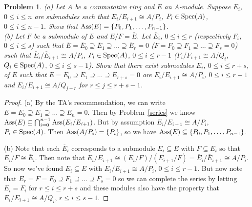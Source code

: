 \documentclass{article}
\newcommand{\ass}{\textup{Ass}}
\newcommand{\spec}{\textup{Spec}}
\newtheorem{problem}{Problem}
\begin{document}
\begin{problem}
\label{existsseries}
(a) Let $A$ be a commutative ring and $E$ an $A$-module. Suppose $E_i$, $0 \leq i \leq n$ are submodules such that $E_i/E_{i+1} \cong A/P_i$, $P_i \in \spec(A)$, $0 \leq i \leq n-1$. Show that $\ass(E) = \{P_0, P_1, \dots , P_{n-1}\}$.\\
(b) Let $F$ be a submodule of $E$ and $E/F = \overline{E}$. Let $\overline{E}_i$, $0 \leq i \leq r$ (respectively $F_i$, $0 \leq i \leq s$) such that $\overline{E} = \overline{E}_0 \supseteq \overline{E}_1 \supseteq \dots \supseteq \overline{E}_r = 0$ ($F = F_0 \supseteq F_1 \supseteq \dots \supseteq F_s = 0$) such that $\overline{E}_i/\overline{E}_{i+1} \cong A/P_i$, $P_i \in \spec(A)$, $0 \leq i \leq r-1$ ($F_i/F_{i+1} \cong A/Q_i$, $Q_i \in \spec(A)$, $0 \leq i \leq s-1$). Show that there exist submodules $E_i$, $0 \leq i \leq r+s$, of $E$ such that $E = E_0 \supseteq E_1 \supseteq \dots \supseteq E_{r+s} = 0$ are $E_i/E_{i+1} \cong A/P_i$, $0 \leq i \leq r-1$ and $E_i/E_{i+1} \cong A/Q_{j-r}$ for $r \leq j \leq r+s-1$.
\end{problem}
\begin{proof}
(a) By the TA's recommendation, we can write $E = E_0 \supseteq E_1 \supseteq \dots \supseteq E_n = 0$. Then by Problem~\ref{series} we know $\ass(E) \subseteq \bigcap_{i=0}^{n-1} \ass(E_i/E_{i+1})$. But by assumption $E_i/E_{i+1} \cong A/P_i$, $P_i \in \spec(A)$. Then $\ass(A/P_i) = \{P_i\}$, so we have $\ass(E) \subseteq \{P_0, P_1, \dots , P_{n-1}\}$.

(b) Note that each $\overline{E}_i$ corresponds to a submodule $E_i \subseteq E$ with $F \subseteq E_i$ so that $E_i/F \cong \overline{E}_i$. Then note that $E_i/E_{i+1} \cong (E_i/F)/(E_{i+1}/F) = \overline{E}_i/\overline{E}_{i+1} \cong A/P_i$. So now we've found $E_i \subseteq E$ with $E_i/E_{i+1} \cong A/P_i$, $0 \leq i \leq r-1$. But now note that $E_r = F = F_0 \supseteq F_1 \supseteq \dots \supseteq F_s = 0$ so we can complete the series by letting $E_i = F_i$ for $r \leq i \leq r+s$ and these modules also have the property that $E_i/E_{i+1} \cong A/Q_i$, $r \leq i \leq s-1$.
\end{proof}
\end{document}
